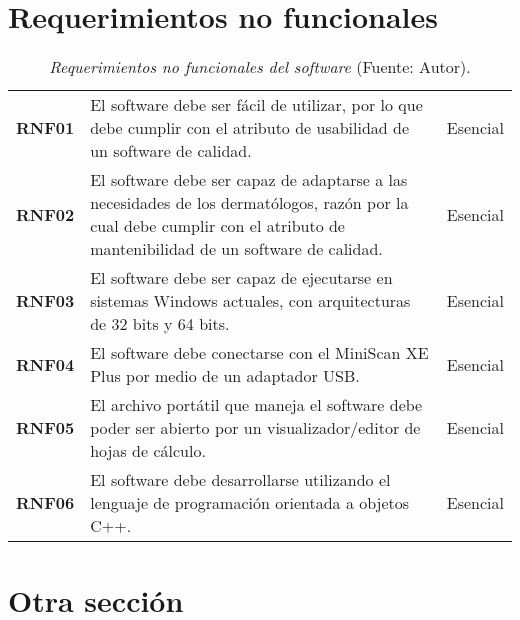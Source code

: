 \section{Requerimientos no funcionales}
	\blindtext
	
	\begin{table}[t]
		\small
		\caption{\textit{Requerimientos no funcionales del software} (Fuente: Autor).}
		\centering
		\setlength{\extrarowheight}{\altocelda}
		\begin{tabulary}{\anchotabla}{|c|J|c|}
			\hline
			 &  & \\ \hline
			\textbf{RNF01} & El software debe ser f\'{a}cil de utilizar, por lo que debe cumplir con el atributo de usabilidad de un software de calidad. & Esencial\\ \hline
			\textbf{RNF02} & El software debe ser capaz de adaptarse a las necesidades de los dermat\'{o}logos, raz\'{o}n por la cual debe cumplir con el atributo de mantenibilidad de un software de calidad. & Esencial\\ \hline
			\textbf{RNF03} & El software debe ser capaz de ejecutarse en sistemas Windows actuales, con arquitecturas de 32 bits y 64 bits. & Esencial\\ \hline
			\textbf{RNF04} & El software debe conectarse con el MiniScan XE Plus por medio de un adaptador USB. & Esencial\\ \hline
			\textbf{RNF05} & El archivo port\'{a}til que maneja el software debe poder ser abierto por un visualizador/editor de hojas de c\'{a}lculo. & Esencial\\ \hline
			\textbf{RNF06} & El software debe desarrollarse utilizando el lenguaje de programaci\'{o}n orientada a objetos C++. & Esencial\\ \hline
		\end{tabulary}
	\end{table}
	
\section{Otra secci\'{o}n}
	\blindtext